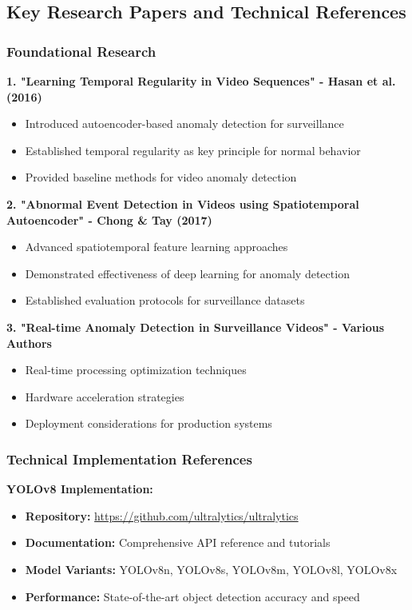 \documentclass[12pt,a4paper]{article}
\begin{document}
\subsection{Key Research Papers and Technical References}

\subsubsection{Foundational Research}

\textbf{1. "Learning Temporal Regularity in Video Sequences" - Hasan et al. (2016)}
\begin{itemize}
    \item Introduced autoencoder-based anomaly detection for surveillance
    \item Established temporal regularity as key principle for normal behavior
    \item Provided baseline methods for video anomaly detection
\end{itemize}

\textbf{2. "Abnormal Event Detection in Videos using Spatiotemporal Autoencoder" - Chong \& Tay (2017)}
\begin{itemize}
    \item Advanced spatiotemporal feature learning approaches
    \item Demonstrated effectiveness of deep learning for anomaly detection
    \item Established evaluation protocols for surveillance datasets
\end{itemize}

\textbf{3. "Real-time Anomaly Detection in Surveillance Videos" - Various Authors}
\begin{itemize}
    \item Real-time processing optimization techniques
    \item Hardware acceleration strategies
    \item Deployment considerations for production systems
\end{itemize}

\subsubsection{Technical Implementation References}

\textbf{YOLOv8 Implementation:}
\begin{itemize}
    \item \textbf{Repository:} \url{https://github.com/ultralytics/ultralytics}
    \item \textbf{Documentation:} Comprehensive API reference and tutorials
    \item \textbf{Model Variants:} YOLOv8n, YOLOv8s, YOLOv8m, YOLOv8l, YOLOv8x
    \item \textbf{Performance:} State-of-the-art object detection accuracy and speed
\end{itemize}
\end{document}
